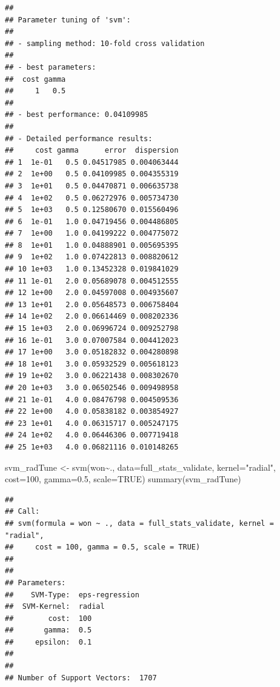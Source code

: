 \documentclass[
]{article}
\newenvironment{Shaded}{\begin{snugshade}}{\end{snugshade}}
\newcommand{\AttributeTok}[1]{\textcolor[rgb]{0.77,0.63,0.00}{#1}}
\newcommand{\ConstantTok}[1]{\textcolor[rgb]{0.00,0.00,0.00}{#1}}
\newcommand{\DecValTok}[1]{\textcolor[rgb]{0.00,0.00,0.81}{#1}}
\newcommand{\FloatTok}[1]{\textcolor[rgb]{0.00,0.00,0.81}{#1}}
\newcommand{\FunctionTok}[1]{\textcolor[rgb]{0.00,0.00,0.00}{#1}}
\newcommand{\NormalTok}[1]{#1}
\newcommand{\OtherTok}[1]{\textcolor[rgb]{0.56,0.35,0.01}{#1}}
\newcommand{\SpecialCharTok}[1]{\textcolor[rgb]{0.00,0.00,0.00}{#1}}
\newcommand{\StringTok}[1]{\textcolor[rgb]{0.31,0.60,0.02}{#1}}
\begin{document}
\begin{verbatim}
## 
## Parameter tuning of 'svm':
## 
## - sampling method: 10-fold cross validation 
## 
## - best parameters:
##  cost gamma
##     1   0.5
## 
## - best performance: 0.04109985 
## 
## - Detailed performance results:
##     cost gamma      error  dispersion
## 1  1e-01   0.5 0.04517985 0.004063444
## 2  1e+00   0.5 0.04109985 0.004355319
## 3  1e+01   0.5 0.04470871 0.006635738
## 4  1e+02   0.5 0.06272976 0.005734730
## 5  1e+03   0.5 0.12580670 0.015560496
## 6  1e-01   1.0 0.04719456 0.004486805
## 7  1e+00   1.0 0.04199222 0.004775072
## 8  1e+01   1.0 0.04888901 0.005695395
## 9  1e+02   1.0 0.07422813 0.008820612
## 10 1e+03   1.0 0.13452328 0.019841029
## 11 1e-01   2.0 0.05689078 0.004512555
## 12 1e+00   2.0 0.04597008 0.004935607
## 13 1e+01   2.0 0.05648573 0.006758404
## 14 1e+02   2.0 0.06614469 0.008202336
## 15 1e+03   2.0 0.06996724 0.009252798
## 16 1e-01   3.0 0.07007584 0.004412023
## 17 1e+00   3.0 0.05182832 0.004280898
## 18 1e+01   3.0 0.05932529 0.005618123
## 19 1e+02   3.0 0.06221438 0.008302670
## 20 1e+03   3.0 0.06502546 0.009498958
## 21 1e-01   4.0 0.08476798 0.004509536
## 22 1e+00   4.0 0.05838182 0.003854927
## 23 1e+01   4.0 0.06315717 0.005247175
## 24 1e+02   4.0 0.06446306 0.007719418
## 25 1e+03   4.0 0.06821116 0.010148265
\end{verbatim}

\begin{Shaded}
\begin{Highlighting}[]
\NormalTok{svm\_radTune }\OtherTok{\textless{}{-}} \FunctionTok{svm}\NormalTok{(won}\SpecialCharTok{\textasciitilde{}}\NormalTok{., }\AttributeTok{data=}\NormalTok{full\_stats\_validate, }\AttributeTok{kernel=}\StringTok{"radial"}\NormalTok{, }\AttributeTok{cost=}\DecValTok{100}\NormalTok{, }\AttributeTok{gamma=}\FloatTok{0.5}\NormalTok{, }\AttributeTok{scale=}\ConstantTok{TRUE}\NormalTok{)}
\FunctionTok{summary}\NormalTok{(svm\_radTune)}
\end{Highlighting}
\end{Shaded}

\begin{verbatim}
## 
## Call:
## svm(formula = won ~ ., data = full_stats_validate, kernel = "radial", 
##     cost = 100, gamma = 0.5, scale = TRUE)
## 
## 
## Parameters:
##    SVM-Type:  eps-regression 
##  SVM-Kernel:  radial 
##        cost:  100 
##       gamma:  0.5 
##     epsilon:  0.1 
## 
## 
## Number of Support Vectors:  1707
\end{verbatim}
\end{document}
